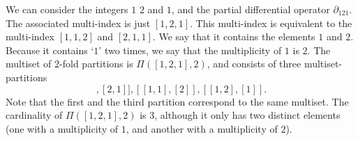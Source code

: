 \documentclass[12pt]{amsart}
\begin{document}
We can consider the integers $1$ $2$ and $1$, and the partial differential operator $\partial_{121}$.
The associated multi-index is just $[1,2,1]$.  This multi-index is equivalent to the multi-index $[1,1,2]$ and $[2,1,1]$.
We say that it contains the elements $1$ and $2$.
Because it contains `$1$' two times, we say that the multiplicity of $1$ is $2$.
The multiset of $2$-fold partitions is $\Pi( [1,2,1],2)$, and consists of three multiset-partitions
\begin{equation*}
	[ [1] , [2,1] ] , [[1,1] , [2] ] , [ [1, 2] , [1] ].
\end{equation*}
Note that the first and the third partition correspond to the same multiset.
The cardinality of $\Pi( [1,2,1],2)$ is $3$, although it only has two distinct elements (one with a multiplicity of $1$, and another with a multiplicity of $2$).
\end{document}
